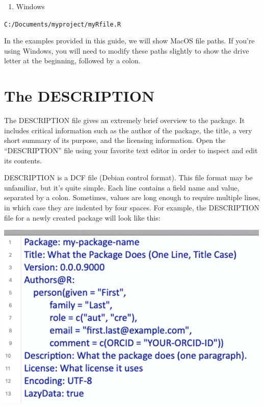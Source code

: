 \documentclass[
]{book}
\providecommand{\tightlist}{%
  \setlength{\itemsep}{0pt}\setlength{\parskip}{0pt}}
\begin{document}
\begin{enumerate}
\def\labelenumi{\arabic{enumi}.}
\setcounter{enumi}{1}
\tightlist
\item
  Windows
\end{enumerate}

\texttt{C:/Documents/myproject/myRfile.R}

In the examples provided in this guide, we will show MacOS file paths. If you're using Windows, you will need to modify these paths slightly to show the drive letter at the beginning, followed by a colon.

\hypertarget{the-description}{%
\section{The DESCRIPTION}\label{the-description}}

The DESCRIPTION file gives an extremely brief overview to the package. It includes critical information such as the author of the package, the title, a very short summary of its purpose, and the licensing information. Open the ``DESCRIPTION'' file using your favorite text editor in order to inspect and edit its contents.

DESCRIPTION is a DCF file (Debian control format). This file format may be unfamiliar, but it's quite simple. Each line contains a field name and value, separated by a colon. Sometimes, values are long enough to require multiple lines, in which case they are indented by four spaces. For example, the DESCRIPTION file for a newly created package will look like this:

\includegraphics{images/packageSS/description_blank.png}
\end{document}
